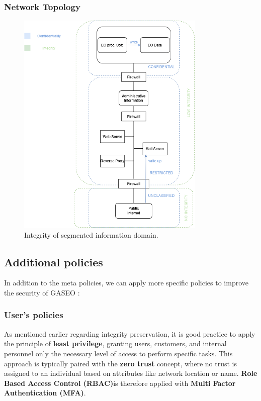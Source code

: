 \documentclass[12pt]{article}
\begin{document}
\newpage
\subsubsection*{Network Topology}

\begin{figure}[h]
    \centering
    \includegraphics[width=0.8\textwidth]{Figures/Solutions/network_topology.png}
    \caption{Integrity of segmented information domain.}
\end{figure}

\newpage

\subsection{Additional policies}
In addition to the meta policies, we can apply more specific policies to improve the security of GASEO :

\subsubsection*{User's policies}
As mentioned earlier regarding integrity preservation, it is good practice to apply the principle of \textbf{least privilege}, granting users, customers, and internal personnel only the necessary level of access to perform specific tasks. This approach is typically paired with the \textbf{zero trust} concept, where no trust is assigned to an individual based on attributes like network location or name. \textbf{Role Based Access Control (RBAC)}is therefore applied with \textbf{Multi Factor Authentication (MFA)}.
\end{document}

